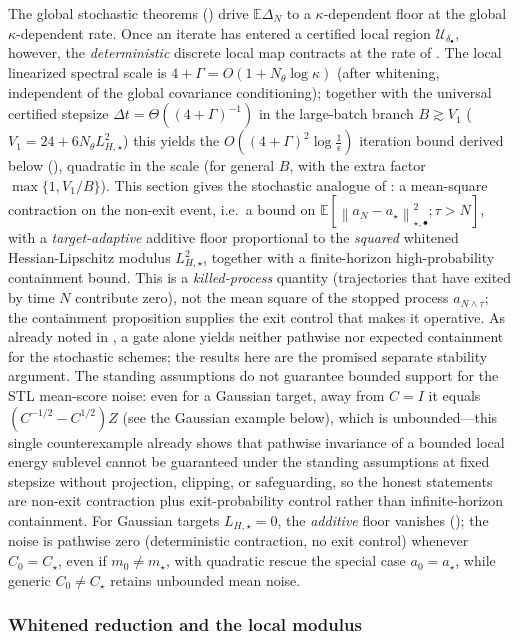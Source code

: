 \documentclass[11pt]{article}
\theoremstyle{plain}
\theoremstyle{definition}
\theoremstyle{remark}
\newcommand{\E}{\mathbb{E}}
\newcommand{\Id}{I}
\newcommand{\norm}[1]{\left\lVert #1\right\rVert}
\newcommand{\Ureg}{\mathcal{U}}
\newcommand{\LHs}{L_{H,\star}}
\begin{document}
The global stochastic theorems () drive $\E\Delta_N$ to a
$\kappa$-dependent floor at the global $\kappa$-dependent rate. Once an iterate has entered a
certified local region $\Ureg_{\delta_\bullet}$, however, the \emph{deterministic} discrete local
map contracts at the rate of . The local linearized spectral scale is
$4+\Gamma=O(1+N_\theta\log\kappa)$ (after whitening, independent of the global covariance
conditioning); together with the universal certified stepsize $\Delta t=\Theta((4+\Gamma)^{-1})$ in the
large-batch branch $B\gtrsim V_1$ ($V_1=24+6N_\theta\LHs^2$) this yields the
$O((4+\Gamma)^2\log\tfrac1\epsilon)$ iteration bound derived below (),
quadratic in the scale (for general $B$, with the extra factor $\max\{1,V_1/B\}$). This section gives the stochastic analogue of : a mean-square
contraction on the non-exit event, i.e.\ a bound on $\E[\norm{a_N-a_\star}_{\star,\bullet}^2;\tau>N]$,
with a \emph{target-adaptive} additive floor proportional to the \emph{squared} whitened
Hessian-Lipschitz modulus $\LHs^2$, together with a finite-horizon high-probability containment bound. This is a
\emph{killed-process} quantity (trajectories that have exited by time $N$ contribute zero), not the
mean square of the stopped process $a_{N\wedge\tau}$; the containment proposition supplies the exit
control that makes it operative. As already noted in , a gate alone yields
neither pathwise nor expected containment for the stochastic schemes; the results here are the
promised separate stability argument. The standing assumptions do not guarantee bounded support for
the STL mean-score noise: even for a Gaussian target, away from $C=\Id$ it equals
$(C^{-1/2}-C^{1/2})Z$ (see the Gaussian example below), which is unbounded---this single counterexample
already shows that pathwise invariance of a bounded local energy sublevel cannot be guaranteed under
the standing assumptions at fixed stepsize without projection, clipping, or safeguarding, so the
honest statements are non-exit contraction plus exit-probability control rather than infinite-horizon
containment. For Gaussian targets $\LHs=0$, the
\emph{additive} floor vanishes (); the noise is pathwise zero (deterministic
contraction, no exit control) whenever $C_0=C_\star$, even if $m_0\neq m_\star$, with quadratic rescue
the special case $a_0=a_\star$, while generic $C_0\neq C_\star$ retains unbounded mean noise.

\subsubsection{Whitened reduction and the local modulus}
\label{subsec:local-whiten}
\end{document}
